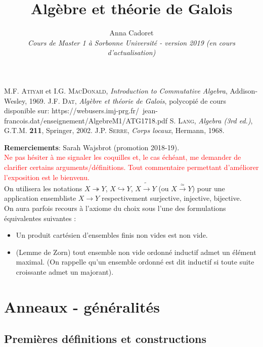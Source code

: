 \documentclass[a4paper, oneside, 12pt]{book}
\title{Algèbre et théorie de Galois}
\author{Anna Cadoret\\
\textit{Cours de Master 1 à Sorbonne Université - version 2019 (en cours d'actualisation)}}
\theoremstyle{theoremeStyle} %
\theoremstyle{definition} %
\begin{document}
\maketitle
\tableofcontents

\begin{thebibliography}{99}
 M.F. \textsc{Atiyah} et I.G. \textsc{MacDonald},
  {\it Introduction to Commutative Algebra}, Addison-Wesley,  1969.
 J.F. \textsc{Dat}, {\it Algèbre et théorie de Galois}, polycopié de cours disponible sur: https://webusers.imj-prg.fr/~jean-francois.dat/enseignement/AlgebreM1/ATG1718.pdf
 S. \textsc{Lang},
  {\it Algebra (3rd ed.)}, G.T.M. \textbf{211}, Springer, 2002.
 J.P. \textsc{Serre},
  {\it Corps locaux}, Hermann, 1968.
\end{thebibliography}

 \textbf{Remerciements}: Sarah Wajsbrot (promotion 2018-19).\\

\textcolor{red}{Ne pas hésiter à me signaler les coquilles et, le cas échéant, me demander de clarifier  certains arguments/définitions. Tout  commentaire permettant d'améliorer l'exposition est le bienvenu.}\\

 On utilisera les notations $X\twoheadrightarrow Y$, $X\hookrightarrow Y$, $X\tilde{\rightarrow} Y$ (ou $X\stackrel{\simeq}{\rightarrow} Y$) pour une application ensembliste $X\rightarrow Y$ respectivement  surjective, injective, bijective.\\


  On aura parfois recours à l'axiome du choix sous l'une des formulations équivalentes suivantes :
 \begin{itemize}
 \item Un produit cartésien d'ensembles finis non vides est non vide.
 \item (Lemme de Zorn) tout ensemble non vide ordonné inductif admet un élément maximal. (On rappelle qu'un ensemble ordonné est dit inductif si toute suite croissante admet un majorant).
 \end{itemize}
\part{Anneaux - généralités}

\chapter{Premières définitions et constructions}
\end{document}
